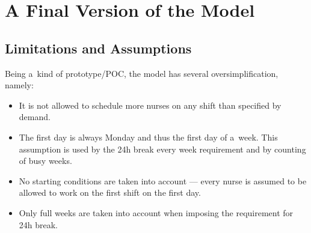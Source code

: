 \section{A Final Version of the Model}


\subsection{Limitations and Assumptions}

Being a~kind of prototype/POC, the model has several oversimplification, namely:

\begin{itemize}
    \item It is not allowed to schedule more nurses on any shift than specified by demand.
    \item The first day is always Monday and thus the first day of a~week. This assumption is used by the 24h break every week requirement and by counting of busy weeks.
    \item No starting conditions are taken into account --- every nurse is assumed to be allowed to work on the first shift on the first day.
    \item Only full weeks are taken into account when imposing the requirement for 24h break.
\end{itemize}


